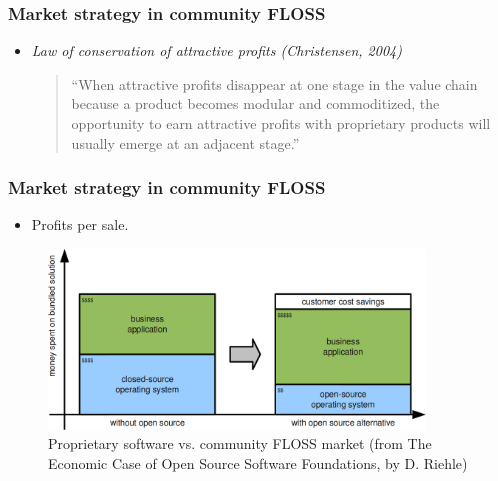 
\begin{frame}
\frametitle{Market strategy in community FLOSS}

\begin{itemize}
 \item \textit{Law of conservation of attractive profits (Christensen, 2004)}
  \begin{center}
   \begin{quote}
    ``When attractive profits disappear at one stage in the value chain because 
a product becomes modular and commoditized, the opportunity to earn attractive profits 
with proprietary products will usually emerge at an adjacent stage.''
   \end{quote}

  \end{center}

\end{itemize}


\end{frame}


\begin{frame}
\frametitle{Market strategy in community FLOSS}
\begin{itemize}
 \item Profits per sale.
\end{itemize}

\begin{center}
  \begin{figure}
    \includegraphics[width=10cm]{figs/floss-vs-closedsw-markets.png}
    \caption{Proprietary software vs. community FLOSS market (from The Economic
Case of Open Source Software Foundations, by D. Riehle)} 
  \end{figure}
\end{center}

\end{frame}

